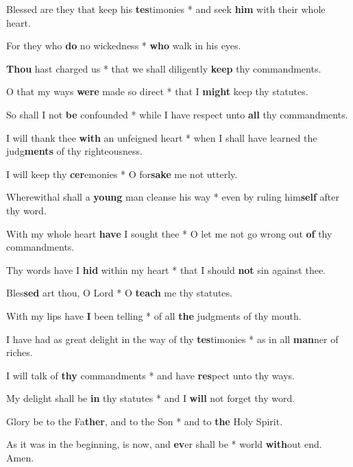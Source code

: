 \begin{multicols}{2}
	Blessed are they that keep his \textbf{tes}timonies * and seek \textbf{him} with their whole heart.
	
	For they who \textbf{do} no wickedness * \textbf{who} walk in his eyes.
	
	\textbf{Thou} hast charged us * that we shall diligently \textbf{keep} thy commandments.
	
	O that my ways \textbf{were} made so direct * that I \textbf{might} keep thy statutes.
		
	So shall I not \textbf{be} confounded * while I have respect unto \textbf{all} thy commandments.
	
	I will thank thee \textbf{with} an unfeigned heart * when I shall have learned the judg\textbf{ments} of thy righteousness.
	
	I will keep thy \textbf{cer}emonies * O for\textbf{sake} me not utterly.
	
	Wherewithal shall a \textbf{young} man cleanse his way * even by ruling him\textbf{self} after thy word.
	
	With my whole heart \textbf{have} I sought thee * O let me not go wrong out \textbf{of} thy commandments.
	
	Thy words have I \textbf{hid} within my heart * that I should \textbf{not} sin against thee.
	
	Bles\textbf{sed} art thou, O Lord * O \textbf{teach} me thy statutes.
	
	With my lips have \textbf{I} been telling * of all \textbf{the} judgments of thy mouth.
	
	I have had as great delight in the way of thy \textbf{tes}timonies * as in all \textbf{man}ner of riches.
	
	I will talk of \textbf{thy} commandments * and have \textbf{res}pect unto thy ways.
	
	My delight shall be \textbf{in} thy statutes * and I \textbf{will} not forget thy word.
	
	Glory be to the Fa\textbf{ther}, and to the Son * and to \textbf{the} Holy Spirit.
	
	As it was in the beginning, is now, and \textbf{ev}er shall be * world \textbf{with}out end. Amen.
\end{multicols}